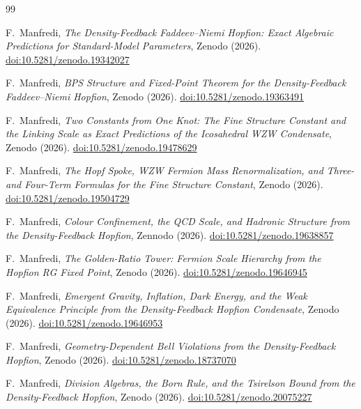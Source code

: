 \documentclass[11pt,a4paper]{article}
\theoremstyle{definition}
\theoremstyle{remark}
\begin{document}
\newpage

\begin{thebibliography}{99}

F.~Manfredi,
\textit{The Density-Feedback Faddeev--Niemi Hopfion:
  Exact Algebraic Predictions for Standard-Model Parameters},
Zenodo (2026).
\href{https://doi.org/10.5281/zenodo.19342027}{doi:10.5281/zenodo.19342027}

F.~Manfredi,
\textit{BPS Structure and Fixed-Point Theorem for the
  Density-Feedback Faddeev--Niemi Hopfion},
Zenodo (2026).
\href{https://doi.org/10.5281/zenodo.19363491}{doi:10.5281/zenodo.19363491}

F.~Manfredi,
\textit{Two Constants from One Knot: The Fine Structure Constant and
  the Linking Scale as Exact Predictions of the Icosahedral WZW Condensate},
Zenodo (2026).
\href{https://doi.org/10.5281/zenodo.19478629}{doi:10.5281/zenodo.19478629}

F.~Manfredi,
\textit{The Hopf Spoke, WZW Fermion Mass Renormalization,
  and Three- and Four-Term Formulas for the Fine Structure Constant},
Zenodo (2026).
\href{https://doi.org/10.5281/zenodo.19504729}{doi:10.5281/zenodo.19504729}

F.~Manfredi,
\textit{Colour Confinement, the QCD Scale, and Hadronic Structure
  from the Density-Feedback Hopfion},
Zennodo (2026).
\href{https://doi.org/10.5281/zenodo.19638857}{doi:10.5281/zenodo.19638857}

F.~Manfredi,
\textit{The Golden-Ratio Tower: Fermion Scale Hierarchy from the Hopfion RG Fixed Point},
Zenodo (2026).
\href{https://doi.org/10.5281/zenodo.19646945}{doi:10.5281/zenodo.19646945}

F.~Manfredi,
\textit{Emergent Gravity, Inflation, Dark Energy, and the Weak
  Equivalence Principle from the Density-Feedback Hopfion Condensate},
Zenodo (2026).
\href{https://doi.org/10.5281/zenodo.19646953}{doi:10.5281/zenodo.19646953}

F.~Manfredi,
\textit{Geometry-Dependent Bell Violations from the Density-Feedback Hopfion},
Zenodo (2026).
\href{https://doi.org/10.5281/zenodo.18737070}{doi:10.5281/zenodo.18737070}

F.~Manfredi,
\textit{Division Algebras, the Born Rule, and the Tsirelson Bound
  from the Density-Feedback Hopfion},
Zenodo (2026).
\href{https://doi.org/10.5281/zenodo.20075227}{doi:10.5281/zenodo.20075227}


\end{thebibliography}
\end{document}
